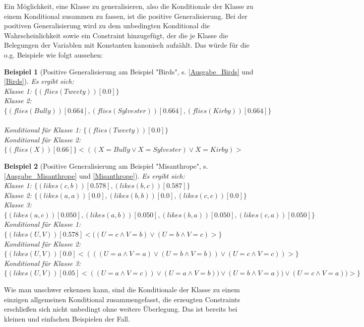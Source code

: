 \documentclass[a4paper, 11pt]{book}
\newtheorem{Bsp}{Beispiel}[section]
\begin{document}
Ein Möglichkeit, eine Klasse zu generalisieren, also die Konditionale der Klasse zu einem Konditional zusammen zu fassen, ist die positive Generalisierung. Bei der positiven Generalisierung wird zu dem unbedingten Konditional die Wahrscheinlichkeit sowie ein Constraint hinzugefügt, der die je Klasse die Belegungen der Variablen mit Konstanten kanonisch aufzählt. 
Das würde für die o.g. Beispiele wie folgt aussehen:\\
\begin{Bsp}[Positive Generalisierung am Beispiel "{}Birds"{}, s. \ref{Ausgabe_Birds} und \ref{Birds}] 
	Es ergibt sich:\\
	
	\noindent
	Klasse 1: $\{(flies(Tweety))[0.0]\}$\\
	Klasse 2: $\{(flies(Bully))[0.664], (flies(Sylvester))[0.664], (flies(Kirby))[0.664]\}$\\
	\\
	Konditional für Klasse 1: $\{(flies(Tweety))[0.0]\}$\\
	Konditional für Klasse 2: $\{(flies(X))[0.66]\} <((X = Bully \lor X = Sylvester) \lor X = Kirby)>$\\
\end{Bsp}
\begin{Bsp}[Positive Generalisierung am Beispiel "{}Misanthrope"{}, s. \ref{Ausgabe_Misanthrope} und \ref{Misanthrope}]
	Es ergibt sich:\\
	
	\noindent
	Klasse 1: $ \{(likes(c,b))[0.578], (likes(b,c))[0.587]\} $\\
	Klasse 2: $ \{(likes(a,a))[0.0], (likes(b,b))[0.0], (likes(c,c))[0.0]\} $\\
	Klasse 3: $ \{(likes(a,c))[0.050], (likes(a,b))[0.050], (likes(b,a))[0.050], (likes(c,a))[0.050]\} $\\

	\noindent
	Konditional für Klasse 1: $ \{(likes(U,V))[0.578] <((U = c \land V = b) \lor (U = b \land V = c)>\} $\\
	Konditional für Klasse 2: $ \{(likes(U,V))[0.0] <(((U = a \land V = a) \lor (U = b \land V = b)) \lor (U = c \land V = c)) >\} $\\
	Konditional für Klasse 3: $ \{(likes(U,V))[0.05] <((U = a \land V = c)) \lor (U = a \land V = b)) \lor (U = b \land V = a)) \lor (U = c \land V = a))>\} $\\
\end{Bsp}
Wie man unschwer erkennen kann, sind die Konditionale der Klasse zu einem einzigen allgemeinen Konditional zusammengefasst, die erzeugten Constraints erschließen sich nicht unbedingt ohne weitere Überlegung. Das ist bereits bei kleinen und einfachen Beispielen der Fall.
\\
\end{document}

